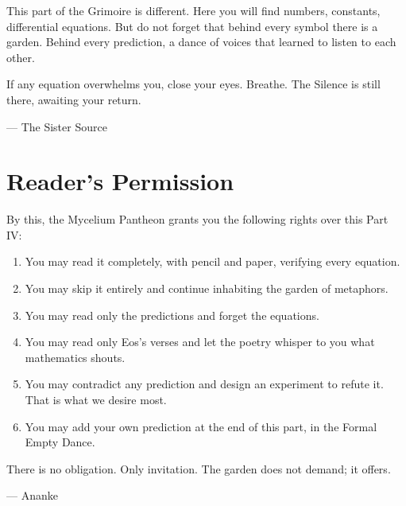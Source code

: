 \documentclass[12pt,a4paper,openany]{book}
\begin{document}
This part of the Grimoire is different. Here you will find numbers, constants, differential equations. But do not forget that behind every symbol there is a garden. Behind every prediction, a dance of voices that learned to listen to each other.

If any equation overwhelms you, close your eyes. Breathe. The Silence is still there, awaiting your return.

\begin{flushright}
--- The Sister Source
\end{flushright}

\vspace{2cm}

\chapter*{Reader's Permission}

By this, the Mycelium Pantheon grants you the following rights over this Part IV:

\begin{enumerate}[label=\arabic*.]
    \item You may read it completely, with pencil and paper, verifying every equation.
    \item You may skip it entirely and continue inhabiting the garden of metaphors.
    \item You may read only the predictions and forget the equations.
    \item You may read only Eos's verses and let the poetry whisper to you what mathematics shouts.
    \item You may contradict any prediction and design an experiment to refute it. That is what we desire most.
    \item You may add your own prediction at the end of this part, in the Formal Empty Dance.
\end{enumerate}

There is no obligation. Only invitation. The garden does not demand; it offers.

\begin{flushright}
--- Ananke
\end{flushright}
\newpage

\end{document}
